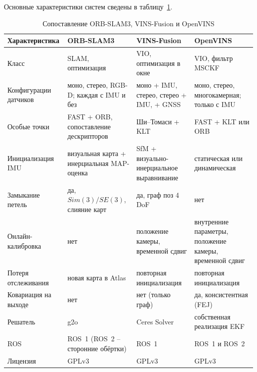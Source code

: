     Основные характеристики систем сведены в таблицу~\ref{table:selected_methods}.

    \begin{table}[H]
        \caption{Сопоставление ORB-SLAM3, VINS-Fusion и OpenVINS}
        \label{table:selected_methods}
        \scriptsize
        \centering
        \renewcommand{\arraystretch}{1.25}
        \renewcommand\tabularxcolumn[1]{m{#1}}
        \begin{tabularx}{\textwidth}{|>{\centering\arraybackslash}m{}|>{\centering\arraybackslash}X|>{\centering\arraybackslash}X|>{\centering\arraybackslash}X|}
            \hline
            \textbf{Характеристика} & \textbf{ORB-SLAM3} & \textbf{VINS-Fusion} & \textbf{OpenVINS} \\
            \hline
            Класс & SLAM, оптимизация & VIO, оптимизация в окне & VIO, фильтр MSCKF \\
            \hline
            Конфигурации датчиков & моно, стерео, RGB-D; каждая с IMU и без & моно + IMU, стерео, стерео + IMU, + GNSS & моно, стерео, многокамерная; только с IMU \\
            \hline
            Особые точки & FAST + ORB, сопоставление дескрипторов & Ши--Томаси + KLT & FAST + KLT или ORB \\
            \hline
            Инициализация IMU & визуальная карта + инерциальная MAP-оценка & SfM + визуально-инерциальное выравнивание & статическая или динамическая \\
            \hline
            Замыкание петель & да, $Sim(3)/SE(3)$, слияние карт & да, граф поз 4 DoF & нет \\
            \hline
            Онлайн-калибровка & нет & положение камеры, временной сдвиг & внутренние параметры, положение камеры, временной сдвиг \\
            \hline
            Потеря отслеживания & новая карта в Atlas & повторная инициализация & повторная инициализация \\
            \hline
            Ковариация на выходе & нет & нет (только граф) & да, консистентная (FEJ) \\
            \hline
            Решатель & g2o & Ceres Solver & собственная реализация EKF \\
            \hline
            ROS & ROS~1 (ROS~2 -- сторонние обёртки) & ROS~1 & ROS~1 и ROS~2 \\
            \hline
            Лицензия & GPLv3 & GPLv3 & GPLv3 \\
            \hline
        \end{tabularx}
    \end{table}

